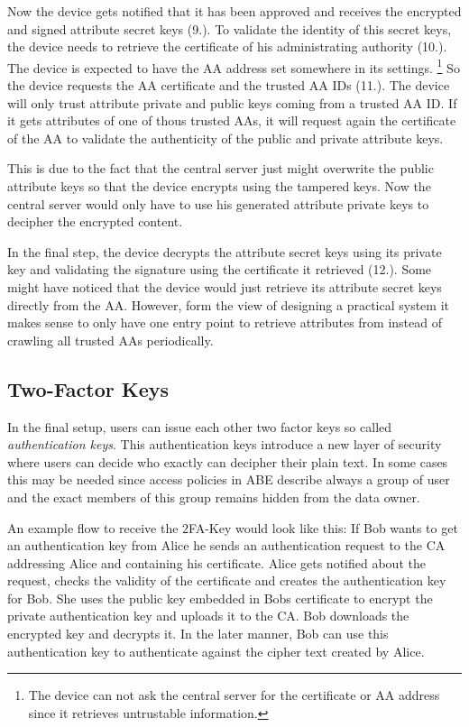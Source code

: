 Now the device gets notified that it has been approved and receives the encrypted and signed attribute secret keys (9.). To validate the identity of this secret keys, the device needs to retrieve the certificate of his administrating authority (10.). The device is expected to have the AA address set somewhere in its settings. \footnote{The device can not ask the central server for the certificate or AA address since it retrieves untrustable information.} So the device requests the AA certificate and the trusted AA IDs (11.). The device will only trust attribute private and public keys coming from a trusted AA ID. If it gets attributes of one of thous trusted AAs, it will request again the certificate of the AA to validate the authenticity of the public and private attribute keys. 

This is due to the fact that the central server just might overwrite the public attribute keys so that the device encrypts using the tampered keys. Now the central server would only have to use his generated attribute private keys to decipher the encrypted content. 

In the final step, the device decrypts the attribute secret keys using its private key and validating the signature using the certificate it retrieved (12.). Some might have noticed that the device would just retrieve its attribute secret keys directly from the AA. However, form the view of designing a practical system it makes sense to only have one entry point to retrieve attributes from instead of crawling all trusted AAs periodically. 

\subsection{Two-Factor Keys}
In the final setup, users can issue each other two factor keys so called \textit{authentication keys}. This authentication keys introduce a new layer of security where users can decide who exactly can decipher their plain text. In some cases this may be needed since access policies in ABE describe always a group of user and the exact members of this group remains hidden from the data owner.
 
An example flow to receive the 2FA-Key would look like this: If Bob wants to get an authentication key from Alice he sends an authentication request to the CA addressing Alice and containing his certificate. Alice gets notified about the request, checks the validity of the certificate and creates the authentication key for Bob. She  uses the public key embedded in Bobs certificate to encrypt the private authentication key and uploads it to the CA. Bob downloads the encrypted key and decrypts it. In the later manner, Bob can use this authentication key to authenticate against the cipher text created by Alice. 

